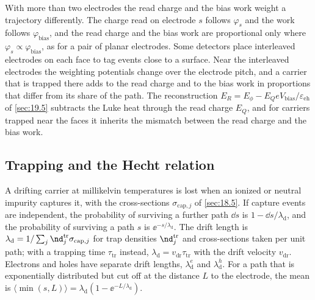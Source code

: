 With more than two electrodes the read charge and the bias work weight a trajectory differently. The charge read on electrode $s$ follows $\varphi_s$ and the work follows $\varphi_{\mathrm{bias}}$, and the read charge and the bias work are proportional only where $\varphi_s \propto \varphi_{\mathrm{bias}}$, as for a pair of planar electrodes. Some detectors place interleaved electrodes on each face to tag events close to a surface. Near the interleaved electrodes the weighting potentials change over the electrode pitch, and a carrier that is trapped there adds to the read charge and to the bias work in proportions that differ from its share of the path. The reconstruction $E_R = E_\phi - E_QeV_{\mathrm{bias}}/\varepsilon_{\mathrm{eh}}$ of \cref{sec:19.5} subtracts the Luke heat through the read charge $E_Q$, and for carriers trapped near the faces it inherits the mismatch between the read charge and the bias work.

\subsection{Trapping and the Hecht relation}\label{sec:20.1-hecht}

A drifting carrier at millikelvin temperatures is lost when an ionized or neutral impurity captures it, with the cross-sections $\sigma_{\mathrm{cap},j}$ of \cref{sec:18.5}. If capture events are independent, the probability of surviving a further path $\dd s$ is $1 - \dd s/\lambda_{\mathrm{d}}$, and the probability of surviving a path $s$ is $\ee^{-s/\lambda_{\mathrm{d}}}$. The drift length is $\lambda_{\mathrm{d}} = 1/\sum_j\nd^{\mathrm{tr}}_j\sigma_{\mathrm{cap},j}$ for trap densities $\nd^{\mathrm{tr}}_j$ and cross-sections taken per unit path; with a trapping time $\tau_{\mathrm{tr}}$ instead, $\lambda_{\mathrm{d}} = v_{\mathrm{dr}}\tau_{\mathrm{tr}}$ with the drift velocity $v_{\mathrm{dr}}$. Electrons and holes have separate drift lengths, $\lambda_{\mathrm{d}}^e$ and $\lambda_{\mathrm{d}}^h$. For a path that is exponentially distributed but cut off at the distance $L$ to the electrode, the mean is $\langle\min(s, L)\rangle = \lambda_{\mathrm{d}}(1 - \ee^{-L/\lambda_{\mathrm{d}}})$.

